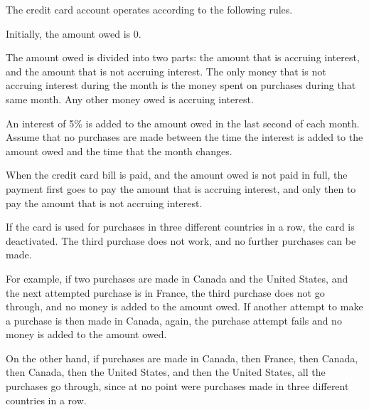 \documentclass[11pt]{article}
\let\ezimeti\itemize
\let\ezimetidne\enditemize
\renewenvironment{itemize}
   {\ezimeti
    \setlength{\topsep}{.25ex plus .125ex minus .1825ex}%
    \setlength{\itemsep}{\topsep}\setlength{\parsep}{0ex}%
    \setlength{\leftmargin}{1.75em}\setlength{\labelsep}{.5em}%
    \setlength{\labelwidth}{1.75em}\ignorespaces}
   {\ezimetidne}
\begin{document}
The credit card account operates according to the following rules.
\begin{itemize}
	\item Initially, the amount owed is 0.
	\item The amount owed is divided into two parts: the amount that is accruing interest, and the amount that is not accruing interest. The only money that is not accruing interest during the month is the money spent on purchases during that same month. Any other money owed is accruing interest.
	\item An interest of 5\% is added to the amount owed in the last second of each month. Assume that no purchases are made between the time the interest is added to the amount owed and the time that the month changes.
	\item When the credit card bill is paid, and the amount owed is not paid in full, the payment first goes to pay the amount that is accruing interest, and only then to pay the amount that is not accruing interest.
	\item If the card is used for purchases in three different countries in a row, the card is deactivated. The third purchase does not work, and no further purchases can be made. 

For example, if two purchases are made in Canada and the United States, and the next attempted purchase is in France, the third purchase does not go through, and no money is added to the amount owed. If another attempt to make a purchase is then made in Canada, again, the purchase attempt fails and no money is added to the amount owed.

On the other hand, if purchases are made in Canada, then France, then Canada, then Canada, then the United States, and then the United States, all the purchases go through, since at no point were purchases made in three different countries in a  row.
\end{itemize}

\newpage
\end{document}
